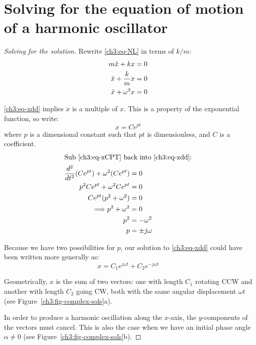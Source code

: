 \section{Solving for the equation of motion of a harmonic oscillator}

\begin{proof}[Solving for the solution]
Rewrite \eqref{ch3:eq-NL} in terms of $k/m$:
\begin{align}
m\ddot{x} + kx &= 0 \notag\\
\ddot{x} + \frac{k}{m}x &= 0 \notag\\
\ddot{x} + \omega^2 x  &= 0 \label{ch3:eq-xdd}
\end{align}

\eqref{ch3:eq-xdd} implies $\ddot{x}$ is a multiple of $x$. This is a property of the exponential function, so write: 
\begin{equation}
	x=Ce^{pt} \label{ch3:eq-xCPT}
\end{equation}
where $p$ is a dimensional constant such that $pt$ is dimensionless, and $C$ is a coefficient.
%
\begin{align*}
\intertext{Sub \eqref{ch3:eq-xCPT} back into \eqref{ch3:eq-xdd}:}
\frac{d^2}{dt^2}(Ce^{pt})+\omega^2(Ce^{pt}) &= 0\\
p^2Ce^{pt}+\omega^2Ce^{pt}&=0 \\
Ce^{pt}(p^2+\omega^2) &=0 \\
\Longrightarrow p^2 + \omega^2 &= 0 \\
p^2 &= -\omega^2 \\
p &= \pm j\omega
\end{align*}

Because we have two possibilities for $p$, our solution to \eqref{ch3:eq-xdd} could have been written more generally as:
\[ x = C_1e^{j\omega t}+C_2e^{-j\omega t} \]


Geometrically, $x$ is the sum of two vectors: one with length $C_1$ rotating CCW and another with length $C_2$ going CW, both with the same angular displacement $\omega t$ (see Figure~\ref{ch3:fig-complex-sols}a).

In order to produce a harmonic oscillation along the $x$-axis, the $y$-components of the vectors must cancel. This is also the case when we have an initial phase angle $\alpha\neq 0$ (see Figure~\ref{ch3:fig-complex-sols}b).


\end{proof}
